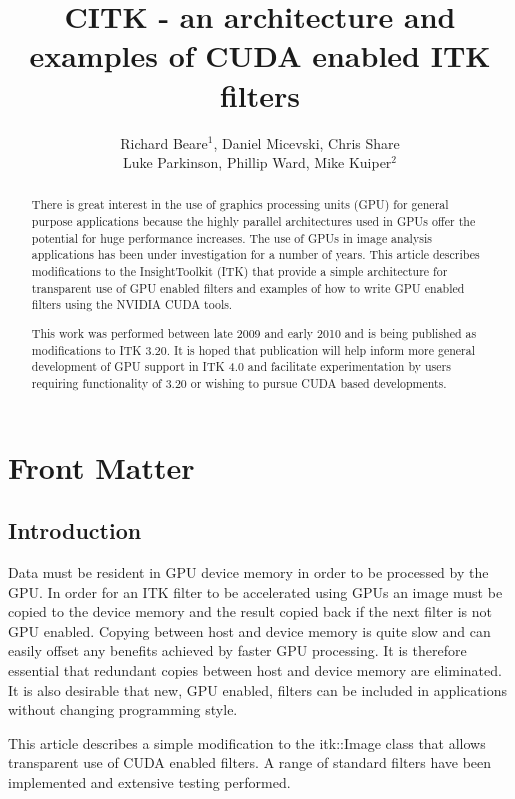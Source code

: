 \documentclass{InsightArticle}
\title{CITK - an architecture and examples of CUDA enabled ITK filters}
\author{Richard Beare{$^1$}, Daniel Micevski, Chris Share\\Luke Parkinson, Phillip Ward, Mike Kuiper{$^2$}}
\begin{document}
\maketitle

\ifhtml
\chapter*{Front Matter\label{front}}
\fi


\begin{abstract}
\noindent
There is great interest in the use of graphics processing units (GPU)
for general purpose applications because the highly parallel
architectures used in GPUs offer the potential for huge performance
increases. The use of GPUs in image analysis applications has been
under investigation for a number of years. This article describes
modifications to the InsightToolkit (ITK) that provide a simple
architecture for transparent use of GPU enabled filters and examples
of how to write GPU enabled filters using the NVIDIA CUDA tools.

This work was performed between late 2009 and early 2010 and is being
published as modifications to ITK 3.20. It is hoped that publication will
help inform more general development of GPU support in ITK 4.0 and
facilitate experimentation by users requiring functionality of 3.20 or
wishing to pursue CUDA based developments.
\end{abstract}

\tableofcontents

\section{Introduction}
Data must be resident in GPU device memory in order to be processed by
the GPU. In order for an ITK filter to be accelerated using GPUs an
image must be copied to the device memory and the result copied back
if the next filter is not GPU enabled. Copying between host and device
memory is quite slow and can easily offset any benefits achieved by
faster GPU processing. It is therefore essential that redundant copies
between host and device memory are eliminated. It is also desirable
that new, GPU enabled, filters can be included in applications without
changing programming style.

This article describes a simple modification to the itk::Image class
that allows transparent use of CUDA enabled filters. A range of
standard filters have been implemented and extensive testing
performed.
\end{document}
